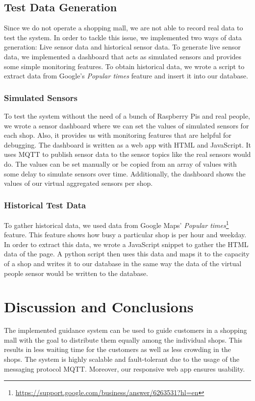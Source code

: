 \documentclass[runningheads]{llncs}
\begin{document}
\subsection{Test Data Generation}
Since we do not operate a shopping mall, we are not able to record real data to test the system. In order to tackle this issue, we implemented two ways of data generation: Live sensor data and historical sensor data. To generate live sensor data, we implemented a dashboard that acts as simulated sensors and provides some simple monitoring features. To obtain historical data, we wrote a script to extract data from Google's \textit{Popular times} feature and insert it into our database.

\subsubsection{Simulated Sensors}
To test the system without the need of a bunch of Raspberry Pis and real people, we wrote a sensor dashboard where we can set the values of simulated sensors for each shop. Also, it provides us with monitoring features that are helpful for debugging. The dashboard is written as a web app with HTML and JavaScript. It uses MQTT to publish sensor data to the sensor topics like the real sensors would do. The values can be set manually or be copied from an array of values with some delay to simulate sensors over time. Additionally, the dashboard shows the values of our virtual aggregated sensors per shop.

\subsubsection{Historical Test Data}
To gather historical data, we used data from Google Maps' \textit{Popular times}\footnote{\url{https://support.google.com/business/answer/6263531?hl=en}} feature. This feature shows how busy a particular shop is per hour and weekday. In order to extract this data, we wrote a JavaScript snippet to gather the HTML data of the page. A python script then uses this data and maps it to the capacity of a shop and writes it to our database in the same way the data of the virtual people sensor would be written to the database.


\section{Discussion and Conclusions}\label{sec:discussion}
The implemented guidance system can be used to guide customers in a shopping mall with the goal to distribute them equally among the individual shops. This results in less waiting time for the customers as well as less crowding in the shops. The system is highly scalable and fault-tolerant due to the usage of the messaging protocol MQTT. Moreover, our responsive web app ensures usability.
\end{document}

